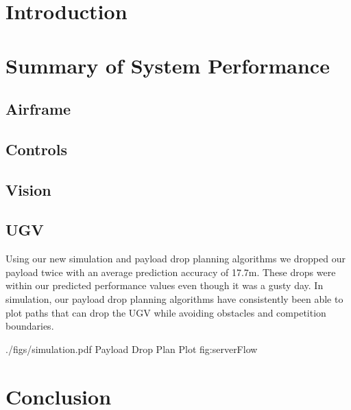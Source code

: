 \documentclass[]{auvsi_doc}
\begin{document}
\begin{AUVSITitlePage}
\begin{artifacttable}
\end{artifacttable}
\end{AUVSITitlePage}

\section{Introduction}



\section{Summary of System Performance}



\subsection{Airframe}
\subsection{Controls}
\subsection{Vision}
\subsection{UGV}

Using our new simulation and payload drop planning algorithms we dropped our payload twice with an average
prediction accuracy of 17.7m. These drops were within our predicted performance values even though it was
a gusty day. In simulation, our payload drop planning algorithms have consistently been able to plot paths
that can drop the UGV while avoiding obstacles and competition boundaries.

\AUVSIFigure
{./figs/simulation.pdf}
{\textwidth}
{Payload Drop Plan Plot}
{fig:serverFlow}

\section{Conclusion}
\end{document}
